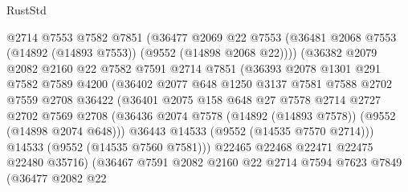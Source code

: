 \begin{lexlean}{RustStd}
\begin{coremodule}
                      @2714
                      @7553
                      @7582
                      @7851
                      (@36477
                        @2069
                        @22
                        @7553
                        (@36481 @2068 @7553 (@14892 (@14893 @7553)) (@9552 (@14898 @2068 @22))))
                      (@36382
                        @2079
                        @2082
                        @2160
                        @22
                        @7582
                        @7591
                        @2714
                        @7851
                        (@36393
                          @2078
                          @1301
                          @291
                          @7582
                          @7589
                          @4200
                          (@36402
                            @2077
                            @648
                            @1250
                            @3137
                            @7581
                            @7588
                            @2702
                            @7559
                            @2708
                            @36422
                            (@36401
                              @2075
                              @158
                              @648
                              @27
                              @7578
                              @2714
                              @2727
                              @2702
                              @7569
                              @2708
                              (@36436
                                @2074
                                @7578
                                (@14892 (@14893 @7578))
                                (@9552 (@14898 @2074 @648)))
                              @36443
                              @14533
                              (@9552 (@14535 @7570 @2714)))
                            @14533
                            (@9552 (@14535 @7560 @7581)))
                          @22465
                          @22468
                          @22471
                          @22475
                          @22480
                          @35716)
                        (@36467
                          @7591
                          @2082
                          @2160
                          @22
                          @2714
                          @7594
                          @7623
                          @7849
                          (@36477
                            @2082
                            @22

\end{coremodule}
\end{lexlean}
